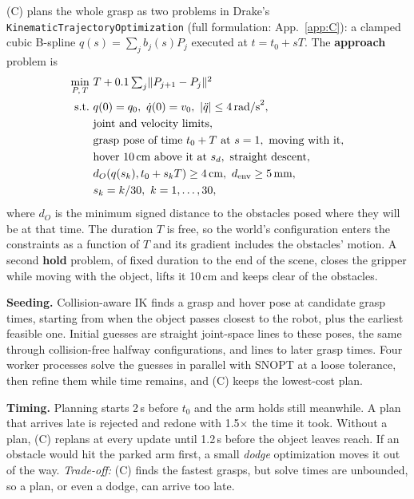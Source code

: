\documentclass[conference]{IEEEtran}
\begin{document}
(C) plans the whole grasp as two problems in Drake's \texttt{KinematicTrajectoryOptimization} (full formulation: App.~\ref{app:C}): a clamped
cubic B-spline $q(s)=\sum_j b_j(s)P_j$ executed at $t=t_0+sT$. The \textbf{approach} problem is
\begin{equation}
\begin{aligned}
\min_{P,\,T}\ & T + 0.1\textstyle\sum_j \lVert P_{j+1}-P_j\rVert^2\\
\text{s.t.}\ & q(0)=q_0,\ \dot q(0)=v_0,\ |\ddot q|\le 4\,\text{rad/s}^2,\\
& \text{joint and velocity limits},\\
& \text{grasp pose of time } t_0+T \text{ at } s=1, \text{ moving with it},\\
& \text{hover 10\,cm above it at } s_d, \text{ straight descent},\\
& d_O(q(s_k), t_0+s_kT)\ge 4\,\text{cm},\ d_{\text{env}}\ge 5\,\text{mm},\\
& s_k = k/30,\ k=1,\dots,30,
\end{aligned}
\label{eq:kto}
\end{equation}
where $d_O$ is the minimum signed distance to the obstacles posed where they will be at that time. The
duration $T$ is free, so the world's configuration enters the constraints as a function of $T$ and its
gradient includes the obstacles' motion. A second \textbf{hold} problem, of fixed duration to the end of
the scene, closes the gripper while moving with the object, lifts it 10\,cm and keeps clear of the
obstacles.

\textbf{Seeding.} Collision-aware IK finds a grasp and hover pose at candidate grasp times, starting
from when the object passes closest to the robot, plus the earliest feasible one. Initial guesses are
straight joint-space lines to these poses, the same through collision-free halfway configurations, and
lines to later grasp times. Four worker processes solve the guesses in parallel with SNOPT at a loose
tolerance, then refine them while time remains, and (C) keeps the lowest-cost plan.

\textbf{Timing.} Planning starts 2\,s before $t_0$ and the arm holds still meanwhile. A plan that arrives
late is rejected and redone with 1.5$\times$ the time it took. Without a plan, (C) replans at every update
until 1.2\,s before the object leaves reach. If an obstacle would hit the parked arm first, a small \emph{dodge}
optimization moves it out of the way. \emph{Trade-off:} (C) finds the fastest grasps, but solve times are
unbounded, so a plan, or even a dodge, can arrive too late.
\end{document}

